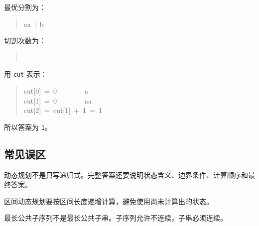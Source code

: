 \documentclass[UTF8,zihao=-4]{ctexart}
\begin{document}
最优分割为：

\begin{quote}
\small\ttfamily\raggedright
\relax aa\ |\ b\\
\end{quote}

切割次数为：

\begin{quote}
\small\ttfamily\raggedright
{}\\
\end{quote}

用 \texttt{cut} 表示：

\begin{quote}
\small\ttfamily\raggedright
\relax cut[0]\ =\ 0\ \ \ \ \ \ \ \ a\\
\relax cut[1]\ =\ 0\ \ \ \ \ \ \ \ aa\\
\relax cut[2]\ =\ cut[1]\ +\ 1\ =\ 1\\
\end{quote}

所以答案为 \texttt{1}。

\subsection*{常见误区}

动态规划不是只写递归式。完整答案还要说明状态含义、边界条件、计算顺序和最终答案。

区间动态规划要按区间长度递增计算，避免使用尚未计算出的状态。

最长公共子序列不是最长公共子串。子序列允许不连续，子串必须连续。
\end{document}
